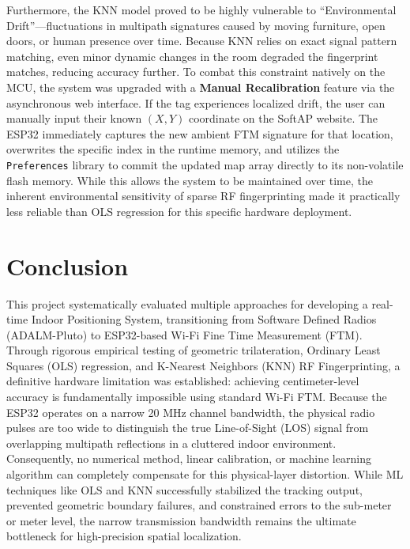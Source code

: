 \documentclass[conference]{IEEEtran}
\begin{document}
Furthermore, the KNN model proved to be highly vulnerable to ``Environmental Drift''---fluctuations in multipath signatures caused by moving furniture, open doors, or human presence over time. Because KNN relies on exact signal pattern matching, even minor dynamic changes in the room degraded the fingerprint matches, reducing accuracy further. To combat this constraint natively on the MCU, the system was upgraded with a \textbf{Manual Recalibration} feature via the asynchronous web interface. If the tag experiences localized drift, the user can manually input their known $(X,Y)$ coordinate on the SoftAP website. The ESP32 immediately captures the new ambient FTM signature for that location, overwrites the specific index in the runtime memory, and utilizes the \texttt{Preferences} library to commit the updated map array directly to its non-volatile flash memory. While this allows the system to be maintained over time, the inherent environmental sensitivity of sparse RF fingerprinting made it practically less reliable than OLS regression for this specific hardware deployment.

\newpage

\section{Conclusion}
This project systematically evaluated multiple approaches for developing a real-time Indoor Positioning System, transitioning from Software Defined Radios (ADALM-Pluto) to ESP32-based Wi-Fi Fine Time Measurement (FTM). Through rigorous empirical testing of geometric trilateration, Ordinary Least Squares (OLS) regression, and K-Nearest Neighbors (KNN) RF Fingerprinting, a definitive hardware limitation was established: achieving centimeter-level accuracy is fundamentally impossible using standard Wi-Fi FTM. Because the ESP32 operates on a narrow 20 MHz channel bandwidth, the physical radio pulses are too wide to distinguish the true Line-of-Sight (LOS) signal from overlapping multipath reflections in a cluttered indoor environment. Consequently, no numerical method, linear calibration, or machine learning algorithm can completely compensate for this physical-layer distortion. While ML techniques like OLS and KNN successfully stabilized the tracking output, prevented geometric boundary failures, and constrained errors to the sub-meter or meter level, the narrow transmission bandwidth remains the ultimate bottleneck for high-precision spatial localization.
\end{document}
